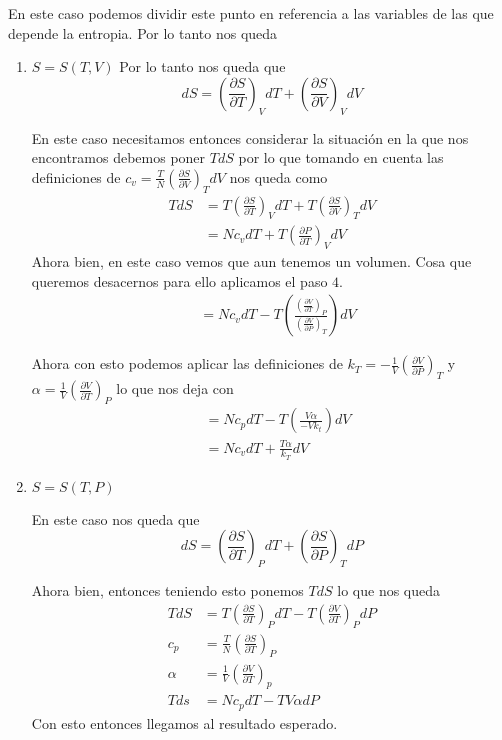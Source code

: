 \documentclass{report}
\begin{document}
En este caso podemos dividir este punto en referencia a las variables de las que depende la entropia. Por lo tanto nos queda
\begin{enumerate}
  \item $S=S(T,V)$
    Por lo tanto nos queda que
    \begin{equation*}
      dS = \left( \frac{\partial {S}}{\partial {T}} \right)_V dT + \left( \frac{\partial {S}}{\partial {V}}\right)_V dV
    \end{equation*}
    
    En este caso necesitamos entonces considerar la situación en la que nos encontramos debemos poner $TdS$ por lo que tomando en cuenta las definiciones de $c_v=\frac{T}{N} \left( \frac{\partial {S}}{\partial {V}} \right)_T {dV}$ nos queda como
    \begin{align*}
      TdS &= T \left( \frac{\partial {S}}{\partial {T}} \right)_V dT + T\left( \frac{\partial {S}}{\partial {V}}\right)_T dV \\
          &= Nc_vdT + T \left( \frac{\partial {P}}{\partial {T}} \right)_V dV
    \end{align*}
    Ahora bien, en este caso vemos que aun tenemos un volumen. Cosa que queremos desacernos para ello aplicamos el  paso $4$. 
    \begin{align*}
      &= Nc_vdT - T \left( \frac{\left( \frac{\partial {V}}{\partial {T}} \right)_P}{\left( \frac{\partial {V}}{\partial {P}} \right)_T}  \right)dV
    \end{align*}

    Ahora con esto podemos aplicar las definiciones de $k_T=-\frac{1}{V} \left( \frac{\partial {V}}{\partial {P}} \right)_T$ y $\alpha=\frac{1}{V} \left( \frac{\partial {V}}{\partial {T}} \right)_P$ lo que nos deja con 
    \begin{align}
       &= Nc_pdT - T \left( \frac{V\alpha}{-Vk_t}  \right)dV\\
       &= Nc_vdT + \frac{T\alpha}{k_T} dV
    \end{align}

  \item $S=S(T,P)$

    En este caso nos queda que
    \begin{equation*}
      dS = \left( \frac{\partial {S}}{\partial {T}} \right)_P dT + \left( \frac{\partial {S}}{\partial {P}} \right)_T dP
    \end{equation*}
    
    Ahora bien, entonces teniendo esto ponemos $TdS$ lo que nos queda
    \begin{align*}
      TdS &= T\left( \frac{\partial {S}}{\partial {T}} \right)_P dT - T\left( \frac{\partial {V}}{\partial {T}} \right)_P dP\\
      c_p &= \frac{T}{N} \left( \frac{\partial {S}}{\partial {T}} \right)_P\\
      \alpha &= \frac{1}{V} \left( \frac{\partial {V}}{\partial {T}} \right)_p\\
      Tds &= Nc_pdT - TV\alpha dP
    \end{align*}
    Con esto entonces llegamos al resultado esperado.
\end{enumerate}
\end{document}
